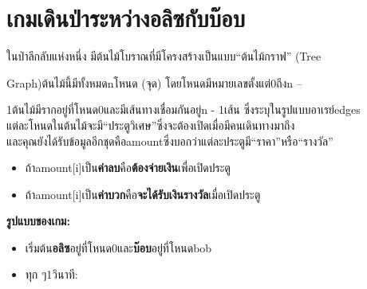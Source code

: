 \documentclass{article}
\begin{document}
\section*{เกมเดินป่าระหว่างอลิซกับบ๊อบ}

ในป่าลึกลับแห่งหนึ่ง มีต้นไม้โบราณที่มีโครงสร้างเป็นแบบ``ต้นไม้กราฟ'' (Tree

Graph)ต้นไม้นี้มีทั้งหมดnโหนด (จุด) โดยโหนดมีหมายเลขตั้งแต่0ถึงn --

1ต้นไม้มีรากอยู่ที่โหนด0และมีเส้นทางเชื่อมกันอยู่n - 1เส้น ซึ่งระบุในรูปแบบอาเรย์edges\\



แต่ละโหนดในต้นไม้จะมี``ประตูวิเศษ''ซึ่งจะต้องเปิดเมื่อมีคนเดินทางมาถึง\\

และคุณยังได้รับข้อมูลอีกชุดคือamountซึ่งบอกว่าแต่ละประตูมี``ราคา''หรือ``รางวัล''



\begin{itemize}

\tightlist

\item

  ถ้าamount{[}i{]}เป็น\textbf{ค่าลบ}คือ\textbf{ต้องจ่ายเงิน}เพื่อเปิดประตู

\item

  ถ้าamount{[}i{]}เป็น\textbf{ค่าบวก}คือ\textbf{จะได้รับเงินรางวัล}เมื่อเปิดประตู

\end{itemize}



\textbf{รูปแบบของเกม:}



\begin{itemize}

\tightlist

\item

  เริ่มต้น\textbf{อลิซ}อยู่ที่โหนด0และ\textbf{บ๊อบ}อยู่ที่โหนดbob

\item

  ทุก ๆ1วินาที:\\

\end{itemize}
\end{document}
